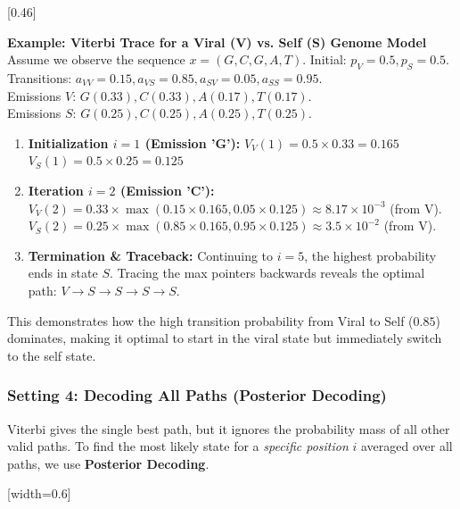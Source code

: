 [0.46]

\textbf{Example: Viterbi Trace for a Viral (V) vs. Self (S) Genome Model} \\
Assume we observe the sequence \( x = (G, C, G, A, T) \).
Initial: \( p_V = 0.5, p_S = 0.5 \). \\
Transitions: \( a_{VV} = 0.15, a_{VS} = 0.85, a_{SV} = 0.05, a_{SS} = 0.95 \). \\
Emissions \( V \): \( G(0.33), C(0.33), A(0.17), T(0.17) \). \\
Emissions \( S \): \( G(0.25), C(0.25), A(0.25), T(0.25) \).

\begin{enumerate}
    \item \textbf{Initialization \( i=1 \) (Emission 'G'):}
    \( V_V(1) = 0.5 \times 0.33 = 0.165 \) \\
    \( V_S(1) = 0.5 \times 0.25 = 0.125 \)
    \item \textbf{Iteration \( i=2 \) (Emission 'C'):}
    \( V_V(2) = 0.33 \times \max(0.15 \times 0.165, 0.05 \times 0.125) \approx 8.17 \times 10^{-3} \) (from V). \\
    \( V_S(2) = 0.25 \times \max(0.85 \times 0.165, 0.95 \times 0.125) \approx 3.5 \times 10^{-2} \) (from V).
    \item \textbf{Termination \& Traceback:} Continuing to \( i=5 \), the highest probability ends in state \( S \). Tracing the max pointers backwards reveals the optimal path: \( V \to S \to S \to S \to S \). 
\end{enumerate}
This demonstrates how the high transition probability from Viral to Self (\(0.85\)) dominates, making it optimal to start in the viral state but immediately switch to the self state.


\subsubsection{Setting 4: Decoding All Paths (Posterior Decoding)}

Viterbi gives the single best path, but it ignores the probability mass of all other valid paths. To find the most likely state for a \textit{specific position} \( i \) averaged over all paths, we use \textbf{Posterior Decoding}.

[width=0.6\textwidth]

